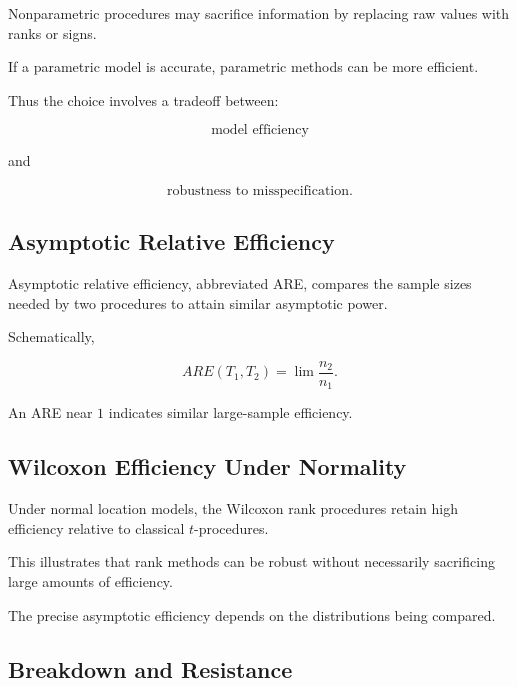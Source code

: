 Nonparametric procedures may sacrifice information by replacing raw
values with ranks or signs.

If a parametric model is accurate, parametric methods can be more
efficient.

Thus the choice involves a tradeoff between:

\[
\boxed{
\text{model efficiency}
}
\]

and

\[
\boxed{
\text{robustness to misspecification}.
}
\]

\subsection{Asymptotic Relative Efficiency}
\label{subsec:asymptotic-relative-efficiency}

Asymptotic relative efficiency, abbreviated ARE, compares the sample
sizes needed by two procedures to attain similar asymptotic power.

Schematically,

\[
\boxed{
ARE(T_1,T_2)
=
\lim
\frac{
n_2
}{
n_1
}.
}
\]

An ARE near \(1\) indicates similar large-sample efficiency.

\subsection{Wilcoxon Efficiency Under Normality}
\label{subsec:wilcoxon-efficiency-normal}

Under normal location models, the Wilcoxon rank procedures retain high
efficiency relative to classical \(t\)-procedures.

This illustrates that rank methods can be robust without necessarily
sacrificing large amounts of efficiency.

The precise asymptotic efficiency depends on the distributions being
compared.

\subsection{Breakdown and Resistance}
\label{subsec:breakdown-resistance}

